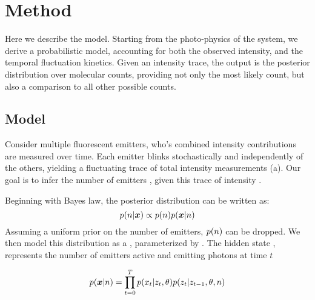 \section{Method}
Here we describe \ours the model.
  Starting from the photo-physics of the system, we derive a probabilistic model, 
  accounting for both the observed intensity, and the temporal fluctuation kinetics.
  Given an intensity trace, the output is the posterior distribution over molecular counts, 
  providing not only the most likely count, but also a comparison to all other possible counts. 

\subsection{Model}
Consider multiple fluorescent emitters, who's combined intensity contributions are measured over time.
  Each emitter blinks stochastically and independently of the others, 
  yielding a fluctuating trace of total intensity measurements (a).
  Our goal is to infer the number of emitters \n, given this trace of intensity \trace.
  
  Beginning with Bayes law, the posterior distribution can be written as:
  \begin{equation*}
    p(n | \bm{x}) \propto p(n) p(\bm{x} | n)
  \end{equation*}
  Assuming a uniform prior on the number of emitters, $p(n)$ can be dropped.
  We then model this distribution as a \hmm, parameterized by \parameters.
    The hidden state \z, represents the number of emitters active and emitting photons at time $t$
    
  \begin{equation}
    p(\bm{x}| n) = \prod_{t=0}^{T} p(x_{t} | z_{t}, \theta) p(z_{t} | z_{t-1}, \theta, n)
    \label{eq:method:HMM}
  \end{equation}

